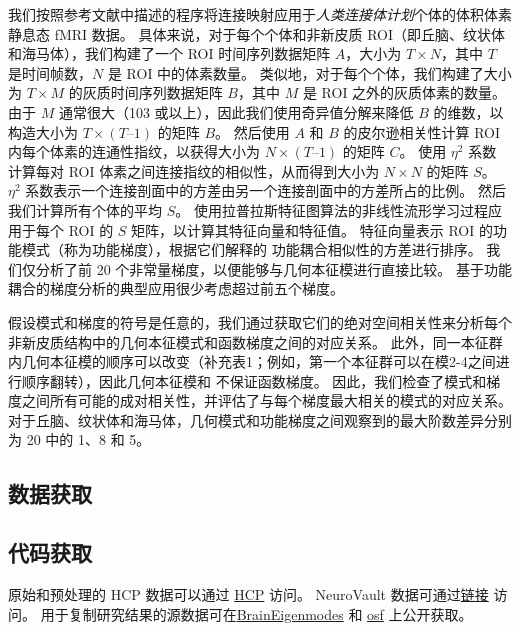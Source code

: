\documentclass[lang=cn,a4paper,newtx]{elegantpaper}
\begin{document}
我们按照参考文献中描述的程序将连接映射应用于\textit{人类连接体计划}个体的体积体素静息态 fMRI 数据\cite{haak2018connectopic}。
具体来说，对于每个个体和非新皮质 ROI（即丘脑、纹状体和海马体），我们构建了一个 ROI 时间序列数据矩阵 $ A $，大小为 $ T \times N $，其中 $ T $ 是时间帧数，$ N $ 是 ROI 中的体素数量。
类似地，对于每个个体，我们构建了大小为 $ T \times M $ 的灰质时间序列数据矩阵 $ B $，其中 $ M $ 是 ROI 之外的灰质体素的数量。
由于 $ M $ 通常很大（103 或以上），因此我们使用奇异值分解来降低 $ B $ 的维数，以构造大小为 $ T \times (T – 1) $ 的矩阵 $ B $。
然后使用 $ A $ 和 $ B $ 的皮尔逊相关性计算 ROI 内每个体素的连通性指纹，以获得大小为 $ N \times (T – 1) $ 的矩阵 $ C $。
使用 $ \eta^2 $ 系数 \cite{alexander2018testing} 计算每对 ROI 体素之间连接指纹的相似性，从而得到大小为 $ N \times N $ 的矩阵 $ S $。
$ \eta^2 $ 系数表示一个连接剖面中的方差由另一个连接剖面中的方差所占的比例。
然后我们计算所有个体的平均 $ S $。 
使用拉普拉斯特征图算法\cite{belkin2003laplacian}的非线性流形学习过程应用于每个 ROI 的 $ S $ 矩阵，以计算其特征向量和特征值。
特征向量表示 ROI 的功能模式（称为功能梯度），根据它们解释的 功能耦合相似性的方差进行排序。
我们仅分析了前 20 个非常量梯度，以便能够与几何本征模进行直接比较。
基于功能耦合的梯度分析的典型应用很少考虑超过前五个梯度\cite{haak2018connectopic,margulies2016situating}。


假设模式和梯度的符号是任意的，我们通过获取它们的绝对空间相关性来分析每个非新皮质结构中的几何本征模式和函数梯度之间的对应关系。
此外，同一本征群内几何本征模的顺序可以改变（补充表1；例如，第一个本征群可以在模2-4之间进行顺序翻转），因此几何本征模和 不保证函数梯度。
因此，我们检查了模式和梯度之间所有可能的成对相关性，并评估了与每个梯度最大相关的模式的对应关系。
对于丘脑、纹状体和海马体，几何模式和功能梯度之间观察到的最大阶数差异分别为 20 中的 1、8 和 5。


\subsection{数据获取} \label{sec:data_availability}

\subsection{代码获取} \label{sec:code_availability}

原始和预处理的 HCP 数据可以通过 \href{https://db. human connectome.org/}{HCP} 访问。
NeuroVault 数据可通过\href{https://neurovault.org/}{链接} 访问。
用于复制研究结果的源数据可在\href{https://github.com/NSBLab/BrainEigenmodes}{BrainEigenmodes}  和 \href{https://osf.io/xczmp/}{osf} 上公开获取。
\end{document}
